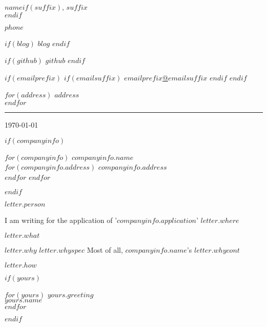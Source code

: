 \documentclass[$fontsize$, a4paper]{article}
\begin{document}
\begin{center}

	{\Huge $name$}$if(suffix)$,  {\large $suffix$}\\[.2cm]$endif$

	\begin{multicols}{3}
		$phone$
		\columnbreak

		$if(blog)$
		\href{http://$blog$}{{\FA \faRss}$blog$}
		$endif$

		$if(github)$
		\href{http://github.com/$github$}{{\FA \faGithub}$github$}
		$endif$

		$if(emailprefix)$
		$if(emailsuffix)$
		\href{mailto:$emailprefix$@$emailsuffix$}{{\FA \faEnvelope}$emailprefix$@$emailsuffix$}
		$endif$
		$endif$

		\columnbreak

		$for(address)$
		$address$\\
		$endfor$

	\end{multicols}
\end{center}


\vspace{-20pt}
\rule{15cm}{0.04cm}
\noindent
\large
\vspace{10pt}

\begin{flushright}
\today\\
\end{flushright}


$if(companyinfo)$
\begin{flushleft}
	$for(companyinfo)$
		\textbf{$companyinfo.name$}\\
		$for(companyinfo.address)$
			$companyinfo.address$\\
		$endfor$
	$endfor$
\end{flushleft}
$endif$


\vspace{4pt}
\begin{flushleft}
$letter.person$\\
\end{flushleft}

\justify
I am writing for the application of '\textbf{$companyinfo.application$}'
$letter.where$\\
\par
$letter.what$\\
\par
$letter.why$ $letter.whyspec$ Most of all, $companyinfo.name$'s $letter.whycont$\\
\par
$letter.how$\\
\par

$if(yours)$
\begin{flushleft}
	$for(yours)$
		$yours.greeting$\\
		$yours.name$\\
	$endfor$
\end{flushleft}
$endif$
\end{document}
